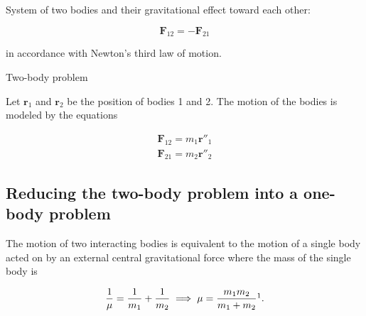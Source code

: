 \begin{frame}{\subsecname}


System of two bodies and their gravitational effect toward each other:

\begin{equation}
\mathbf{F}_{12} = - \mathbf{F}_{21} \label{3rdlaw}
\end{equation}

in accordance with Newton's third law of motion.

\end{frame}

\begin{frame}{\subsecname}

\begin{block}{Two-body problem}

Let \(\mathbf{r}_1\) and \(\mathbf{r}_2\) be the position of bodies 1 and 2. The motion of the bodies is modeled by the equations

\begin{align}
\mathbf{F}_{12} = m_1\mathbf{r}''_1 \label{F1} \\ 
\mathbf{F}_{21} = m_2\mathbf{r}''_2 \label{F2}
\end{align}

\end{block}

\end{frame}


\subsection{Reducing the two-body problem into a one-body problem}

\begin{frame}{\subsecname}

The motion of two interacting bodies is equivalent to the motion of a single body acted on by an external central gravitational force where the mass of the single body is 

\begin{equation}
\frac{1}{\mu}= \frac{1}{m_1} + \frac{1}{m_2} \implies \mu = \frac{m_1m_2}{m_1+m_2}\footnotemark.
\end{equation}


\end{frame}


